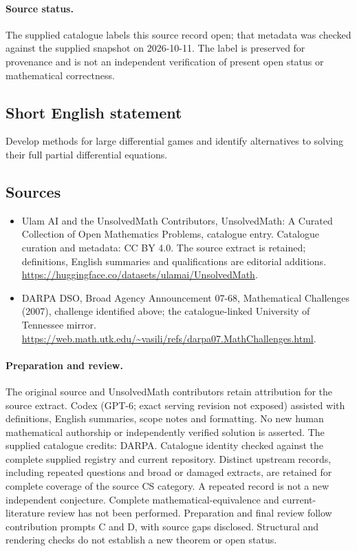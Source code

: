 \documentclass[11pt]{article}
\begin{document}
\paragraph{Source status.}
The supplied catalogue labels this source record open; that metadata was checked against the supplied snapshot on 2026-10-11. The label is preserved for provenance and is not an independent verification of present open status or mathematical correctness.
\subsection{Short English statement}
Develop methods for large differential games and identify alternatives to solving their full partial differential equations.
\subsection{Sources}
\begin{itemize}
\item[\hypertarget{source:statement:1}{S1}] Ulam AI and the UnsolvedMath Contributors, UnsolvedMath: A Curated Collection of Open Mathematics Problems, catalogue entry. Catalogue curation and metadata: CC BY 4.0. The source extract is retained; definitions, English summaries and qualifications are editorial additions.
\url{https://huggingface.co/datasets/ulamai/UnsolvedMath}.
\item[\hypertarget{source:statement:2}{S2}] DARPA DSO, Broad Agency Announcement 07-68, Mathematical Challenges (2007), challenge identified above; the catalogue-linked University of Tennessee mirror.
\url{https://web.math.utk.edu/~vasili/refs/darpa07.MathChallenges.html}.
\end{itemize}
\paragraph{Preparation and review.}
The original source and UnsolvedMath contributors retain attribution for the source extract. Codex (GPT-6; exact serving revision not exposed) assisted with definitions, English summaries, scope notes and formatting. No new human mathematical authorship or independently verified solution is asserted. The supplied catalogue credits: DARPA. Catalogue identity checked against the complete supplied registry and current repository. Distinct upstream records, including repeated questions and broad or damaged extracts, are retained for complete coverage of the source CS category. A repeated record is not a new independent conjecture. Complete mathematical-equivalence and current-literature review has not been performed. Preparation and final review follow contribution prompts C and D, with source gaps disclosed. Structural and rendering checks do not establish a new theorem or open status.
\label{end:statement}
\end{document}
